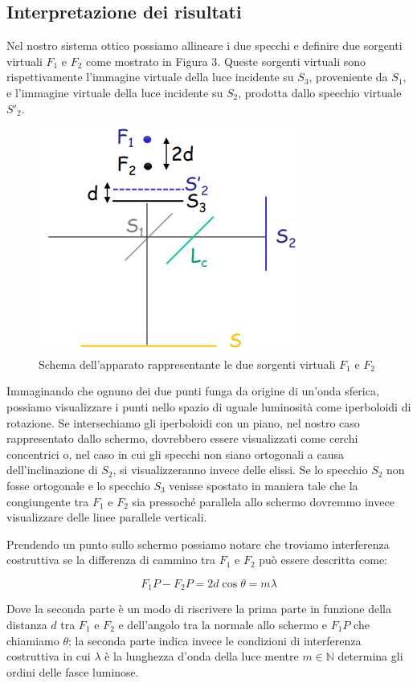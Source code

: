 \documentclass{article}
\begin{document}
\subsection{Interpretazione dei risultati}
Nel nostro sistema ottico possiamo allineare i due specchi e definire due sorgenti virtuali $F_1$ e $F_2$ come mostrato in Figura 3. Queste sorgenti virtuali sono rispettivamente l'immagine virtuale della luce incidente su $S_3$, proveniente da $S_1$, e l'immagine virtuale della luce incidente su $S_2$, prodotta dallo specchio virtuale $S'_2$.

\begin{figure}[h!]
  \centering
  \includegraphics[width=0.3\linewidth]{IM fuochi}
  \caption{Schema dell'apparato rappresentante le due sorgenti virtuali $F_1$ e $F_2$}
\end{figure}


Immaginando che ognuno dei due punti funga da origine di un'onda sferica, possiamo visualizzare i punti nello spazio di uguale luminosità come iperboloidi di rotazione. Se intersechiamo gli iperboloidi con un piano, nel nostro caso rappresentato dallo schermo, dovrebbero essere visualizzati come cerchi concentrici o, nel caso in cui gli specchi non siano ortogonali a causa dell'inclinazione di $S_2$, si visualizzeranno invece delle elissi. 
Se lo specchio $S_2$ non fosse ortogonale e lo specchio $S_3$ venisse spostato in maniera tale che la congiungente tra $F_1$ e $F_2$ sia pressoché parallela allo schermo dovremmo invece visualizzare delle linee parallele verticali. 

\vspace{3mm}

Prendendo un punto sullo schermo possiamo notare che troviamo interferenza costruttiva se la differenza di cammino tra $F_1$ e $F_2$ può essere descritta come:

\begin{equation} 
F_1P - F_2 P = 2d \cos{\theta} = m \lambda 
\end{equation}

Dove la seconda parte è un modo di riscrivere la prima parte in funzione della distanza $d$ tra $F_1$ e $F_2$ e dell'angolo tra la normale allo schermo e $F_1 P$ che chiamiamo $\theta$; la seconda parte indica invece le condizioni di interferenza costruttiva in cui $\lambda$ è la lunghezza d'onda della luce mentre $m \in \mathbb{N}$
determina gli ordini delle fasce luminose.
\end{document}
